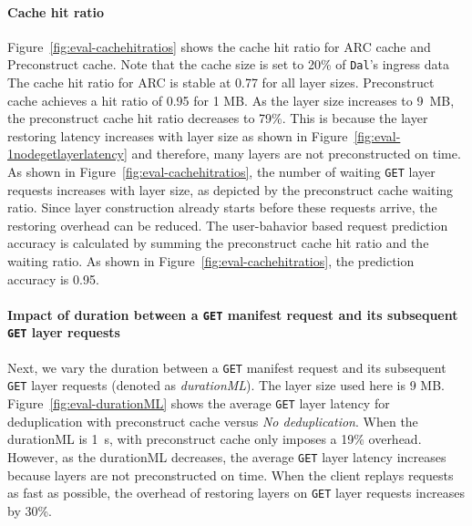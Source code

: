 \paragraph{Cache hit ratio}
Figure~\ref{fig:eval-cachehitratios} shows the cache hit ratio for ARC cache 
and Preconstruct cache.
Note that the cache size is set to 20\% of \texttt{Dal}'s ingress data 
The cache hit ratio for ARC is stable at 0.77 for all layer sizes.
Preconstruct cache achieves a hit ratio of 0.95 for 1 MB.
As the layer size increases to 9~MB, the preconstruct cache hit ratio decreases to 79\%. 
This is because the layer restoring latency increases with layer size as shown in Figure~\ref{fig:eval-1nodegetlayerlatency} and therefore, 
many layers are not preconstructed on time.
As shown in Figure~\ref{fig:eval-cachehitratios}, 
the number of waiting \texttt{GET} layer requests increases with layer size, as depicted by the preconstruct cache waiting ratio.
Since layer construction already starts before these requests arrive, the restoring overhead can be reduced.
The user-bahavior based request prediction accuracy is calculated by summing the preconstruct cache hit ratio and the waiting ratio.
As shown in Figure~\ref{fig:eval-cachehitratios}, the prediction accuracy is 0.95.
 
\paragraph{Impact of duration between a \texttt{GET} manifest request and its subsequent \texttt{GET} layer requests}
Next, we vary the duration between a \texttt{GET} manifest request and its subsequent \texttt{GET} layer requests (denoted as \emph{durationML}).
The layer size used here is 9 MB.
%
Figure~\ref{fig:eval-durationML} shows the average \texttt{GET} layer latency for \sysname deduplication with preconstruct cache versus \emph{No deduplication}.
When the durationML is 1~s, \sysname with preconstruct cache only imposes a 19\% overhead.
However, as the durationML decreases, the average \texttt{GET} layer latency increases because layers are not preconstructed on time.
When the client replays requests as fast as possible, the overhead of restoring layers on \texttt{GET} layer requests increases by 30\%.


